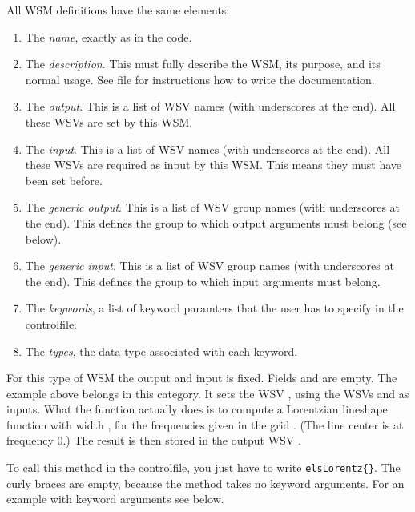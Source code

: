 \noindent
All WSM definitions have the same elements:
\begin{enumerate}
\item The \emph{name}, exactly as in the code.
\item The \emph{description}. This must fully describe the WSM, its
  purpose, and its normal usage. See file  for
  instructions how to write the documentation.
\item The \emph{output}. This is a list of WSV names (with underscores
  at the end). All these WSVs are set by this WSM.
\item The \emph{input}. This is a list of WSV names (with underscores
  at the end). All these WSVs are required as input by this WSM. This
  means they must have been set before.
\item The \emph{generic output}. This is a list of WSV group names (with underscores
  at the end). This defines the group to which output arguments must
  belong (see below).
\item The \emph{generic input}. This is a list of WSV group names (with underscores
  at the end). This defines the group to which input arguments must
  belong.
\item The \emph{keywords}, a list of keyword paramters that the user
  has to specify in the controlfile.
\item The \emph{types}, the data type associated with each keyword.
\end{enumerate}


For this type of WSM the output and input is fixed. Fields
 and  are empty. The example
above belongs in this category. It sets the WSV , using
the WSVs  and  as
inputs. What the function actually does is to compute a Lorentzian
lineshape function with width , for the
frequencies given in the grid . (The line center
is at frequency 0.) The result is then stored in the output WSV
. 

To call this method in the controlfile, you just have to write
\verb|elsLorentz{}|. 
The curly braces are empty, because the
method takes no keyword arguments. For an example with keyword
arguments see below.


